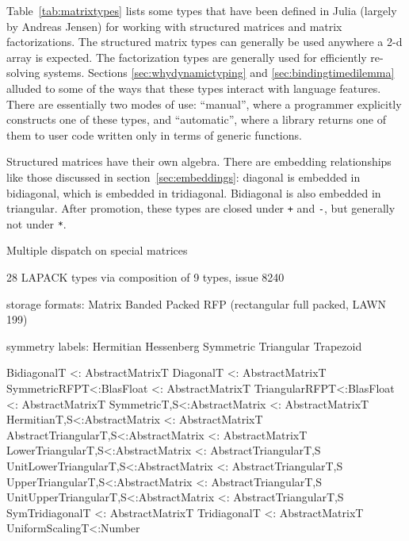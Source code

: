 
Table~\ref{tab:matrixtypes} lists some types that have been defined in
Julia (largely by Andreas Jensen) for working with structured matrices
and matrix factorizations.
The structured matrix types can generally be used anywhere a 2-d
array is expected.
The factorization types are generally used for efficiently re-solving
systems.
Sections \ref{sec:whydynamictyping} and \ref{sec:bindingtimedilemma}
alluded to some of the ways that these types interact with language
features.
There are essentially two modes of use: ``manual'', where a programmer
explicitly constructs one of these types, and ``automatic'', where a
library returns one of them to user code written only in terms of generic
functions.

Structured matrices have their own algebra.
There are embedding relationships like those discussed in section~\ref{sec:embeddings}:
diagonal is embedded in bidiagonal, which is embedded in tridiagonal.
Bidiagonal is also embedded in triangular.
After promotion, these types are closed under \texttt{+} and \texttt{-}, but
generally not under \texttt{*}.

\iffalse
function +(A::Bidiagonal, B::Bidiagonal)
    if A.isupper==B.isupper
        Bidiagonal(A.dv+B.dv, A.ev+B.ev, A.isupper)
    else
        Tridiagonal((A.isupper ? (B.ev,A.dv+B.dv,A.ev) : (A.ev,A.dv+B.dv,B.ev))...)
    end
end
\fi

\iffalse
Multiple dispatch on special matrices

28 LAPACK types via composition of 9 types, issue 8240

storage formats:
Matrix
Banded
Packed
RFP (rectangular full packed, LAWN 199)

symmetry labels:
Hermitian
Hessenberg
Symmetric
Triangular
Trapezoid

Bidiagonal{T} <: AbstractMatrix{T}
Diagonal{T} <: AbstractMatrix{T}
SymmetricRFP{T<:BlasFloat} <: AbstractMatrix{T}
TriangularRFP{T<:BlasFloat} <: AbstractMatrix{T}
Symmetric{T,S<:AbstractMatrix} <: AbstractMatrix{T}
Hermitian{T,S<:AbstractMatrix} <: AbstractMatrix{T}
AbstractTriangular{T,S<:AbstractMatrix} <: AbstractMatrix{T}
LowerTriangular{T,S<:AbstractMatrix} <: AbstractTriangular{T,S}
UnitLowerTriangular{T,S<:AbstractMatrix} <: AbstractTriangular{T,S}
UpperTriangular{T,S<:AbstractMatrix} <: AbstractTriangular{T,S}
UnitUpperTriangular{T,S<:AbstractMatrix} <: AbstractTriangular{T,S}
SymTridiagonal{T} <: AbstractMatrix{T}
Tridiagonal{T} <: AbstractMatrix{T}
UniformScaling{T<:Number}

